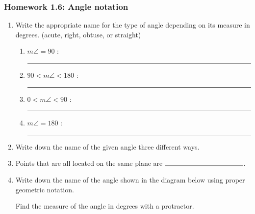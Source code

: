 \documentclass[12pt, oneside]{article}
\begin{document}
\newpage
\subsubsection*{Homework 1.6: Angle notation}
  \begin{enumerate}

    \item Write the appropriate name for the type of angle depending on its measure in degrees. (acute, right, obtuse, or straight)
    \begin{enumerate}
      \item $m\angle = 90$ : \rule{4cm}{0.15mm} \bigskip
      \item $90 < m\angle < 180$ : \rule{4cm}{0.15mm} \bigskip
      \item $0< m\angle < 90$ : \rule{4cm}{0.15mm} \bigskip
      \item $m\angle = 180$ : \rule{4cm}{0.15mm} \bigskip
    \end{enumerate}

    \item Write down the name of the given angle three different ways.\\

    \item Points that are all located on the same plane are $\rule{4cm}{0.15mm}$.

    \item Write down the name of the angle shown in the diagram below using proper geometric notation.
    \begin{center}
    \end{center}
    Find the measure of the angle in degrees with a protractor.


\end{enumerate}
\end{document}
